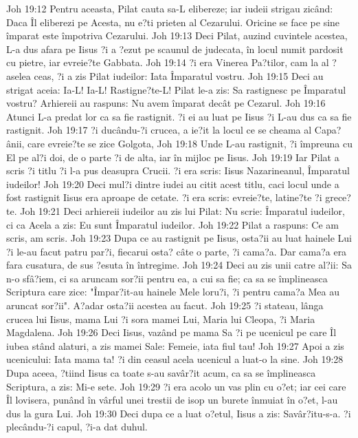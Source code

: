 Joh 19:12  Pentru aceasta, Pilat cauta sa-L elibereze; iar iudeii strigau zicând: Daca Îl eliberezi pe Acesta, nu e?ti prieten al Cezarului. Oricine se face pe sine împarat este împotriva Cezarului.
Joh 19:13  Deci Pilat, auzind cuvintele acestea, L-a dus afara pe Iisus ?i a ?ezut pe scaunul de judecata, în locul numit pardosit cu pietre, iar evreie?te Gabbata.
Joh 19:14  ?i era Vinerea Pa?tilor, cam la al ?aselea ceas, ?i a zis Pilat iudeilor: Iata Împaratul vostru.
Joh 19:15  Deci au strigat aceia: Ia-L! Ia-L! Rastigne?te-L! Pilat le-a zis: Sa rastignesc pe Împaratul vostru? Arhiereii au raspuns: Nu avem împarat decât pe Cezarul.
Joh 19:16  Atunci L-a predat lor ca sa fie rastignit. ?i ei au luat pe Iisus ?i L-au dus ca sa fie rastignit.
Joh 19:17  ?i ducându-?i crucea, a ie?it la locul ce se cheama al Capa?ânii, care evreie?te se zice Golgota,
Joh 19:18  Unde L-au rastignit, ?i împreuna cu El pe al?i doi, de o parte ?i de alta, iar în mijloc pe Iisus.
Joh 19:19  Iar Pilat a scris ?i titlu ?i l-a pus deasupra Crucii. ?i era scris: Iisus Nazarineanul, Împaratul iudeilor!
Joh 19:20  Deci mul?i dintre iudei au citit acest titlu, caci locul unde a fost rastignit Iisus era aproape de cetate. ?i era scris: evreie?te, latine?te ?i grece?te.
Joh 19:21  Deci arhiereii iudeilor au zis lui Pilat: Nu scrie: Împaratul iudeilor, ci ca Acela a zis: Eu sunt Împaratul iudeilor.
Joh 19:22  Pilat a raspuns: Ce am scris, am scris.
Joh 19:23  Dupa ce au rastignit pe Iisus, osta?ii au luat hainele Lui ?i le-au facut patru par?i, fiecarui osta? câte o parte, ?i cama?a. Dar cama?a era fara cusatura, de sus ?esuta în întregime.
Joh 19:24  Deci au zis unii catre al?ii: Sa n-o sfâ?iem, ci sa aruncam sor?ii pentru ea, a cui sa fie; ca sa se împlineasca Scriptura care zice: "Împar?it-au hainele Mele loru?i, ?i pentru cama?a Mea au aruncat sor?ii". A?adar osta?ii acestea au facut.
Joh 19:25  ?i stateau, lânga crucea lui Iisus, mama Lui ?i sora mamei Lui, Maria lui Cleopa, ?i Maria Magdalena.
Joh 19:26  Deci Iisus, vazând pe mama Sa ?i pe ucenicul pe care Îl iubea stând alaturi, a zis mamei Sale: Femeie, iata fiul tau!
Joh 19:27  Apoi a zis ucenicului: Iata mama ta! ?i din ceasul acela ucenicul a luat-o la sine.
Joh 19:28  Dupa aceea, ?tiind Iisus ca toate s-au savâr?it acum, ca sa se împlineasca Scriptura, a zis: Mi-e sete.
Joh 19:29  ?i era acolo un vas plin cu o?et; iar cei care Îl lovisera, punând în vârful unei trestii de isop un burete înmuiat în o?et, l-au dus la gura Lui.
Joh 19:30  Deci dupa ce a luat o?etul, Iisus a zis: Savâr?itu-s-a. ?i plecându-?i capul, ?i-a dat duhul.
